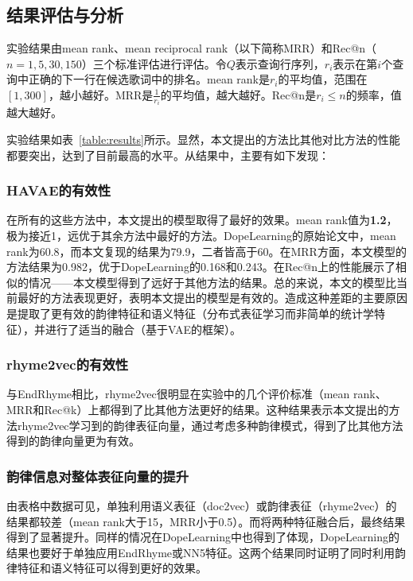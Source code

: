 \subsection{结果评估与分析} \label{subsec:nextresult}
实验结果由mean rank、mean reciprocal rank（以下简称MRR）和Rec@n（$n=1,5,30,150$）三个标准评估进行评估。令$Q$表示查询行序列，$r_i$表示在第$i$个查询中正确的下一行在候选歌词中的排名。mean rank是$r_i$的平均值，范围在$[1, 300]$，越小越好。MRR是$\frac{1}{r_i}$的平均值，越大越好。Rec@n是${r_i} {\leq} n$的频率，值越大越好。\par

实验结果如表~\ref{table:results}所示。显然，本文提出的方法比其他对比方法的性能都要突出，达到了目前最高的水平。从结果中，主要有如下发现：

\subsubsection{HAVAE的有效性}在所有的这些方法中，本文提出的模型取得了最好的效果。mean rank值为\textbf{1.2}，极为接近1，远优于其余方法中最好的方法。DopeLearning的原始论文中，mean rank为60.8，而本文复现的结果为79.9，二者皆高于60。在MRR方面，本文模型的方法结果为0.982，优于DopeLearning的0.168和0.243。在Rec@n上的性能展示了相似的情况——本文模型得到了远好于其他方法的结果。总的来说，本文的模型比当前最好的方法表现更好，表明本文提出的模型是有效的。造成这种差距的主要原因是提取了更有效的韵律特征和语义特征（分布式表征学习而非简单的统计学特征），并进行了适当的融合（基于VAE的框架）。\par

\subsubsection{rhyme2vec的有效性}与EndRhyme相比，rhyme2vec很明显在实验中的几个评价标准（mean rank、MRR和Rec@k）上都得到了比其他方法更好的结果。这种结果表示本文提出的方法rhyme2vec学习到的韵律表征向量，通过考虑多种韵律模式，得到了比其他方法得到的韵律向量更为有效。\par

\subsubsection{韵律信息对整体表征向量的提升}由表格中数据可见，单独利用语义表征（doc2vec）或韵律表征（rhyme2vec）的结果都较差（mean rank大于15，MRR小于0.5）。而将两种特征融合后，最终结果得到了显著提升。同样的情况在DopeLearning中也得到了体现，DopeLearning的结果也要好于单独应用EndRhyme或NN5特征。这两个结果同时证明了同时利用韵律特征和语义特征可以得到更好的效果。\par


